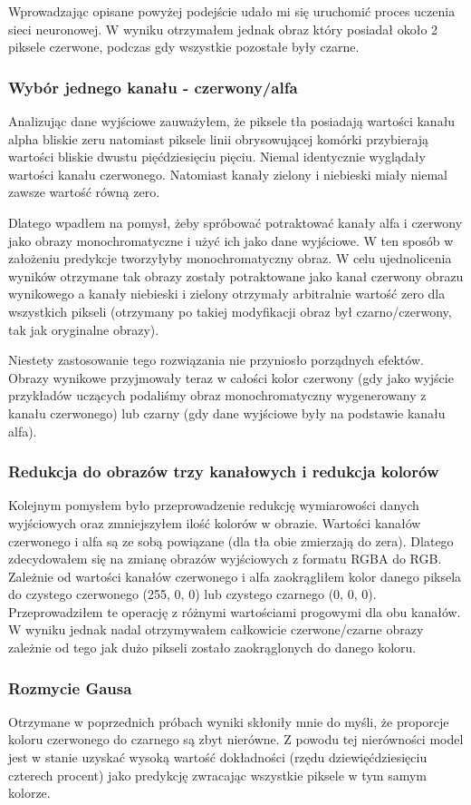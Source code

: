\documentclass{article}
\begin{document}
Wprowadzając opisane powyżej podejście udało mi się uruchomić proces uczenia sieci neuronowej.
W wyniku otrzymałem jednak obraz który posiadał około 2 piksele czerwone, podczas gdy wszystkie pozostałe były czarne.
\subsubsection{Wybór jednego kanału - czerwony/alfa}
Analizując dane wyjściowe zauważyłem, że piksele tła posiadają wartości kanału alpha bliskie zeru natomiast piksele linii obrysowującej komórki przybierają wartości bliskie dwustu pięćdziesięciu pięciu.
Niemal identycznie wyglądały wartości kanału czerwonego.
Natomiast kanały zielony i niebieski miały niemal zawsze wartość równą zero.

Dlatego wpadłem na pomysł, żeby spróbować potraktować kanały alfa i czerwony jako obrazy monochromatyczne i użyć ich jako dane wyjściowe.
W ten sposób w założeniu predykcje tworzyłyby monochromatyczny obraz. W celu ujednolicenia wyników otrzymane tak obrazy zostały potraktowane jako kanał czerwony obrazu wynikowego a kanały niebieski i zielony otrzymały arbitralnie wartość zero dla wszystkich pikseli (otrzymany po takiej modyfikacji obraz był czarno/czerwony, tak jak oryginalne obrazy).

Niestety zastosowanie tego rozwiązania nie przyniosło porządnych efektów.
Obrazy wynikowe przyjmowały teraz w całości kolor czerwony (gdy jako wyjście przykładów uczących podaliśmy obraz monochromatyczny wygenerowany z kanału czerwonego) lub
czarny (gdy dane wyjściowe były na podstawie kanału alfa).
\subsubsection{Redukcja do obrazów trzy kanałowych i redukcja kolorów}
Kolejnym pomysłem było przeprowadzenie redukcję wymiarowości danych wyjściowych oraz zmniejszyłem ilość kolorów w obrazie.
Wartości kanałów czerwonego i alfa są ze sobą powiązane (dla tła obie zmierzają do zera).
Dlatego zdecydowałem się na zmianę obrazów wyjściowych z formatu RGBA do RGB.
Zależnie od wartości kanałów czerwonego i alfa zaokrągliłem kolor danego piksela do czystego czerwonego (255, 0, 0) lub czystego czarnego (0, 0, 0).
Przeprowadziłem te operację z różnymi wartościami progowymi dla obu kanałów.
W wyniku jednak nadal otrzymywałem całkowicie czerwone/czarne obrazy zależnie od tego jak dużo pikseli zostało zaokrąglonych do danego koloru.
\subsubsection{Rozmycie Gausa}
Otrzymane w poprzednich próbach wyniki skłoniły mnie do myśli, że proporcje koloru czerwonego do czarnego są zbyt nierówne.
Z powodu tej nierówności model jest w stanie uzyskać wysoką wartość dokładności (rzędu dziewięćdziesięciu czterech procent) jako predykcję zwracając wszystkie piksele w tym samym kolorze.
\end{document}
